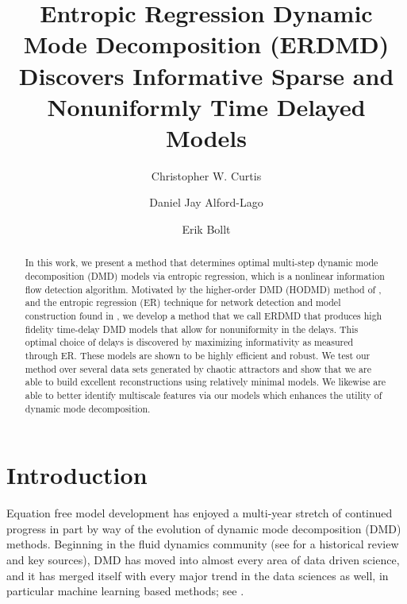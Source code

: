\documentclass[a4paper,11pt]{article}
\title{ \bf Entropic Regression Dynamic Mode Decomposition (ERDMD) Discovers Informative Sparse and Nonuniformly Time Delayed Models}
\author[1]{Christopher W. Curtis}
\author[1,2]{Daniel Jay Alford-Lago}
\author[3,4]{Erik Bollt}
\affil[1]{Department of Mathematics and Statistics, SDSU}
\affil[2]{Naval Information Warfare Center}
\affil[3]{Department of Electrical and Computer Engineering, Clarkson University}
\affil[4]{Clarkson Center for Complex Systems Science, Clarkson University}
\date{}
\begin{document}
\maketitle


\begin{abstract}
In this work, we present a method that determines optimal multi-step dynamic mode decomposition (DMD) models via entropic regression, which is a nonlinear information flow detection algorithm.  
Motivated by the higher-order DMD (HODMD) method of \cite{clainche}, and the entropic regression (ER) technique for network detection and model construction found in \cite{bollt, bollt2}, we develop a method that we call ERDMD that produces high fidelity time-delay DMD models that allow for nonuniformity in the delays.  This optimal choice of delays is discovered by maximizing informativity as measured through ER. These models are shown to be highly efficient and robust.  We test our method over several data sets generated by chaotic attractors and show that we are able to build excellent reconstructions using relatively minimal models.  We likewise are able to better identify multiscale features via our models which enhances the utility of dynamic mode decomposition.   
\end{abstract}

\section{Introduction}

Equation free model development has enjoyed a multi-year stretch of continued progress in part by way of the evolution of dynamic mode decomposition (DMD) methods.  Beginning in the fluid dynamics community (see \cite{taira} for a historical review and key sources), DMD has moved into almost every area of data driven science, and it has merged itself with every major trend in the data sciences as well, in particular machine learning based methods; see \cite{lusch, azencot, lago_dldmd}.  
\end{document}
